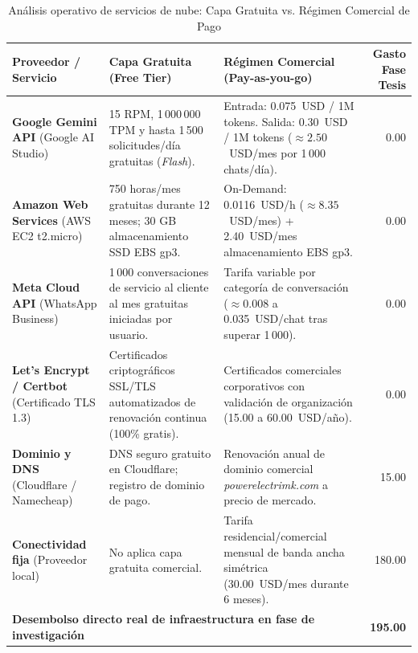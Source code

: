 \begin{table}[H]
\centering
\caption{Análisis operativo de servicios de nube: Capa Gratuita vs. Régimen Comercial de Pago}
\label{tab:costos_operativos_reales}
\small
\begin{tabular}{p{2.8cm} p{4.0cm} p{4.2cm} r}
\toprule
\textbf{Proveedor / Servicio} & \textbf{Capa Gratuita (Free Tier)} & \textbf{Régimen Comercial (Pay-as-you-go)} & \textbf{Gasto Fase Tesis} \\
\midrule
\textbf{Google Gemini API} \newline (Google AI Studio) & 15 RPM, 1\,000\,000 TPM y hasta 1\,500 solicitudes/día gratuitas (\textit{Flash}). & Entrada: 0.075~USD / 1M tokens. \newline Salida: 0.30~USD / 1M tokens ($\approx 2.50$~USD/mes por 1\,000 chats/día). & 0.00 \\
\addlinespace
\textbf{Amazon Web Services} \newline (AWS EC2 t2.micro) & 750 horas/mes gratuitas durante 12 meses; 30 GB almacenamiento SSD EBS gp3. & On-Demand: 0.0116~USD/h ($\approx 8.35$~USD/mes) + 2.40~USD/mes almacenamiento EBS gp3. & 0.00 \\
\addlinespace
\textbf{Meta Cloud API} \newline (WhatsApp Business) & 1\,000 conversaciones de servicio al cliente al mes gratuitas iniciadas por usuario. & Tarifa variable por categoría de conversación ($\approx 0.008$ a 0.035~USD/chat tras superar 1\,000). & 0.00 \\
\addlinespace
\textbf{Let's Encrypt / Certbot} \newline (Certificado TLS 1.3) & Certificados criptográficos SSL/TLS automatizados de renovación continua (100\% gratis). & Certificados comerciales corporativos con validación de organización (15.00 a 60.00~USD/año). & 0.00 \\
\addlinespace
\textbf{Dominio y DNS} \newline (Cloudflare / Namecheap) & DNS seguro gratuito en Cloudflare; registro de dominio de pago. & Renovación anual de dominio comercial \textit{powerelectrimk.com} a precio de mercado. & 15.00 \\
\addlinespace
\textbf{Conectividad fija} \newline (Proveedor local) & No aplica capa gratuita comercial. & Tarifa residencial/comercial mensual de banda ancha simétrica (30.00~USD/mes durante 6 meses). & 180.00 \\
\midrule
\multicolumn{3}{l}{\textbf{Desembolso directo real de infraestructura en fase de investigación}} & \textbf{195.00} \\
\bottomrule
\end{tabular}
\end{table}

